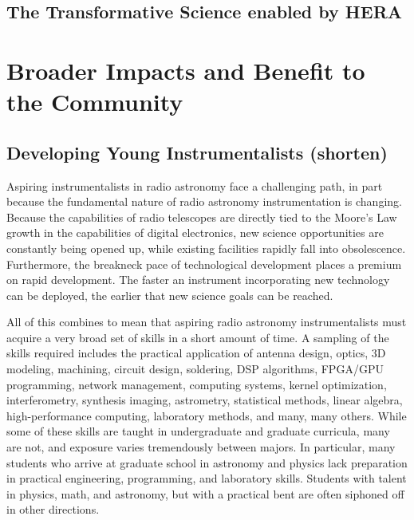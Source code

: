 \documentclass[preprint]{aastex}
\begin{document}
\subsection{The Transformative Science enabled by HERA}


\section{Broader Impacts and Benefit to the Community}
\label{BIsec}



\subsection{Developing Young Instrumentalists (shorten)}
Aspiring instrumentalists in radio astronomy face a challenging path, in part because
the fundamental nature of radio astronomy instrumentation is changing.
Because the capabilities of radio telescopes are directly tied to the Moore's Law
growth in the capabilities of digital electronics,
new science opportunities are constantly being opened up, while existing
facilities rapidly fall into obsolescence.
Furthermore,
the breakneck pace of technological development places a premium on rapid development.
The faster an instrument incorporating new technology can be deployed,
the earlier that new science goals can be reached.

All of this combines to mean that aspiring radio astronomy instrumentalists must acquire a very broad
set of skills in a short amount of time.  A sampling of the skills required includes the practical
application of antenna design, optics,
3D modeling, machining, circuit design, soldering, DSP algorithms, FPGA/GPU programming, network management,
computing systems, kernel optimization, interferometry, synthesis imaging, astrometry, statistical methods, linear
algebra, high-performance
computing, laboratory methods, and many, many others.  While some of these skills are taught
in undergraduate and graduate
curricula, many are not, and exposure varies tremendously between majors.  In particular,
many students who arrive at graduate school in astronomy and physics
lack preparation in
practical engineering, programming, and laboratory skills.  Students with talent in physics, math, and astronomy,
but with a practical bent are often siphoned off in other directions.
\end{document}
